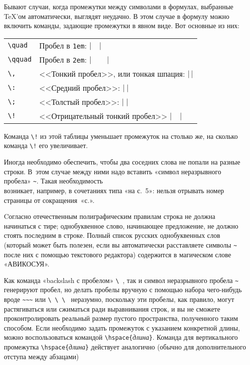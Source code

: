 \documentclass[a4paper,11pt]{article} %
\begin{document}
Бывают случаи, когда промежутки между символами в формулах, выбранные \TeX’ом автоматически, выглядят неудачно. В этом случае в формулу можно включить команды, задающие промежутки в явном виде. Вот основные из них:

\begin{tabular}{ll}
	\verb"\quad" & Пробел в {\tt 1em}: $|\quad|$ \\
	\verb"\qquad" & Пробел в {\tt 2em}: $|\qquad|$ \\
	\verb"\," & <<Тонкий пробел>>, или тонкая шпация: $|\,|$ \\
	\verb"\:" & <<Средний пробел>>: $|\:|$ \\
	\verb"\;" & <<Толстый пробел>>: $|\;|$ \\
	\verb"\!" & <<Отрицательный тонкий пробел>> $|\quad|$
\end{tabular}

Команда \verb"\!" из этой таблицы уменьшает промежуток на столько же, на сколько команда \verb"\!" его увеличивает.

Иногда необходимо обеспечить, чтобы два соседних слова не попали на разные строки. В~этом случае между ними надо вставить «символ неразрывного пробела» \verb"~". Такая необходимость\\
возникает, например, в сочетаниях типа «на с.~5»: нельзя отрывать номер страницы от сокращения~«с.».

Cогласно отечественным полиграфическим правилам строка не должна начинаться с тире; однобуквенное слово, начинающее предложение, не должно стоять последним в строке. Полный список русских однобуквенных слов (который может быть полезен, если вы автоматически расставляете символы \verb"~" после них с помощью текстового редактора) содержится в магическом слове «АВИКОСУЯ».

Как команда «backslash с пробелом» \verb"\ ", так и символ неразрывного пробела \verb|~| генерируют пробел, но делать пробелы вручную с помощью набора чего-нибудь вроде \verb|~~~| или \verb|\ \ \ | неразумно, поскольку эти пробелы, как правило, могут растягиваться или сжиматься ради выравнивания строк, и вы не сможете проконтролировать реальный размер пустого пространства, полученного таким способом. Если необходимо задать промежуток с указанием конкретной длины, можно воспользоваться командой \verb"\hspace{"{\it длина}{\tt \}}. Команда для вертикального промежутка \verb"\hspace{"{\it длина}{\tt \}} действует аналогично (обычно для дополнительного отступа между абзацами)
\end{document}
